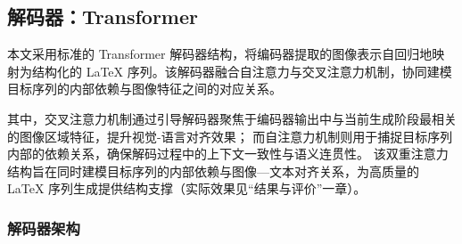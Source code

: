 \subsection{解码器：Transformer}
本文采用标准的 Transformer 解码器结构，将编码器提取的图像表示自回归地映射为结构化的 LaTeX 序列。该解码器融合自注意力与交叉注意力机制，协同建模目标序列的内部依赖与图像特征之间的对应关系。

其中，交叉注意力机制通过引导解码器聚焦于编码器输出中与当前生成阶段最相关的图像区域特征，提升视觉-语言对齐效果；
而自注意力机制则用于捕捉目标序列内部的依赖关系，确保解码过程中的上下文一致性与语义连贯性。
该双重注意力结构旨在同时建模目标序列的内部依赖与图像—文本对齐关系，为高质量的 LaTeX 序列生成提供结构支撑（实际效果见“结果与评价”一章）。

\subsubsection{解码器架构}
